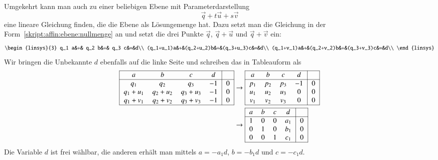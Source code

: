 Umgekehrt kann man auch zu einer beliebigen Ebene mit Parameterdarstellung
\[
\vec{q}+t\vec{u}+s\vec{v}
\]
eine lineare Gleichung finden, die die Ebene als Lösungemenge hat.
Dazu setzt man die Gleichung in der
Form~\eqref{skript:affin:ebene:nullmenge} an und setzt die drei
Punkte $\vec{q}$, $\vec{q}+\vec{u}$ und $\vec{q}+\vec{v}$ ein:
\[
\begin{linsys}{3}
 q_1     a&+& q_2     b&+& q_3     c&=&d\\
(q_1+u_1)a&+&(q_2+u_2)b&+&(q_3+u_3)c&=&d\\
(q_1+v_1)a&+&(q_2+v_2)b&+&(q_3+v_3)c&=&d\\
\end{linsys}
\]
Wir bringen die Unbekannte $d$ ebenfalls auf die linke Seite und schreiben
das in Tableauform als
\begin{align}
\begin{tabular}{|>{$}c<{$}>{$}c<{$}>{$}c<{$}>{$}c<{$}|>{$}c<{$}|}
\hline
a&b&c&d&\\
\hline
q_1&q_2&q_3&-1&0\\
q_1+u_1&q_2+u_2&q_3+u_3&-1&0\\
q_1+v_1&q_2+v_2&q_3+v_3&-1&0\\
\hline
\end{tabular}
&\rightarrow
\begin{tabular}{|>{$}c<{$}>{$}c<{$}>{$}c<{$}>{$}c<{$}|>{$}c<{$}|}
\hline
a&b&c&d&\\
\hline
p_1&p_2&p_3&-1&0\\
u_1&u_2&u_3& 0&0\\
v_1&v_2&v_3& 0&0\\
\hline
\end{tabular}
\label{skript:affin:ebene:abcd}
\\
&\rightarrow
\begin{tabular}{|>{$}c<{$}>{$}c<{$}>{$}c<{$}>{$}c<{$}|>{$}c<{$}|}
\hline
a&b&c&d&\\
\hline
1&0&0&a_1&0\\
0&1&0&b_1&0\\
0&0&1&c_1&0\\
\hline
\end{tabular}
\notag
\end{align}
Die Variable $d$ ist frei wählbar, die anderen erhält man mittels
$a=-a_1d$, $b=-b_1d$ und $c=-c_1d$.

